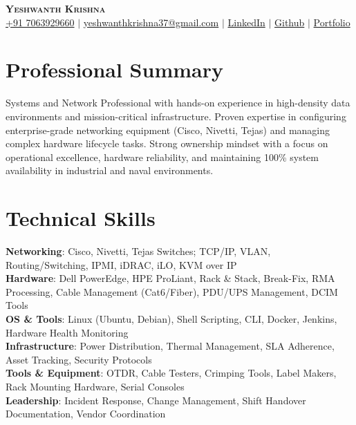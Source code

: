 \documentclass[letterpaper,11pt]{article}
\begin{document}
\begin{center}
    \textbf{\Huge \scshape Yeshwanth Krishna} \\ \vspace{1pt}
    \href{tel:917063929660}{\small +91 7063929660} $|$ \href{mailto:yeshwanthkrishna37@gmail.com}{\small{yeshwanthkrishna37@gmail.com}} $|$ 
    \href{https://linkedin.com/in/yeshwanth-kr}{\small{LinkedIn}} $|$
    \href{https://github.com/Yeshwanth-kr}{\small{Github}} $|$
    \href{https://yeshwanth.online}{\small{Portfolio}}
\end{center}

\section{Professional Summary}
 \small{
  Systems and Network Professional with hands-on experience in high-density data environments and mission-critical infrastructure. Proven expertise in configuring enterprise-grade networking equipment (Cisco, Nivetti, Tejas) and managing complex hardware lifecycle tasks. Strong ownership mindset with a focus on operational excellence, hardware reliability, and maintaining 100\% system availability in industrial and naval environments.
 }

\section{Technical Skills}
 \begin{itemize}[leftmargin=0.15in, label={}]
    \small{\item{
     \textbf{Networking}{: Cisco, Nivetti, Tejas Switches; TCP/IP, VLAN, Routing/Switching, IPMI, iDRAC, iLO, KVM over IP} \\
     \textbf{Hardware}{: Dell PowerEdge, HPE ProLiant, Rack \& Stack, Break-Fix, RMA Processing, Cable Management (Cat6/Fiber), PDU/UPS Management, DCIM Tools} \\
     \textbf{OS \& Tools}{: Linux (Ubuntu, Debian), Shell Scripting, CLI, Docker, Jenkins, Hardware Health Monitoring} \\
     \textbf{Infrastructure}{: Power Distribution, Thermal Management, SLA Adherence, Asset Tracking, Security Protocols} \\
     \textbf{Tools \& Equipment}{: OTDR, Cable Testers, Crimping Tools, Label Makers, Rack Mounting Hardware, Serial Consoles} \\
     \textbf{Leadership}{: Incident Response, Change Management, Shift Handover Documentation, Vendor Coordination} \\
    }}
 \end{itemize}
\end{document}
